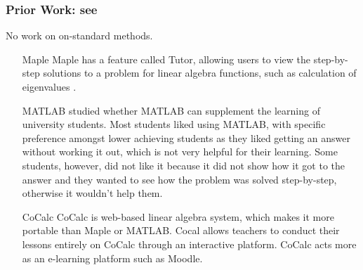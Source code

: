 \begin{frame}%
\frametitle{Prior Work: see \cite{PaiDavenport2021a}}%
No work on on-standard methods.\pause
\begin{itemize}[<+->]
\item[Maple] Maple has a feature called Tutor, allowing users to view the step-by-step solutions to a problem for linear algebra functions, such as calculation of eigenvalues \cite{eigentutor}.

\item[MATLAB] 
\cite{matlab} studied whether MATLAB can %
supplement the learning of university students. Most students liked using MATLAB, with specific preference amongst lower achieving students as they liked getting an answer without working it out, which is not very helpful for their learning. Some students, however, did not like it because it did not show how it got to the answer and they wanted to see how the problem was solved step-by-step, otherwise it wouldn't help them. %

\item[CoCalc] CoCalc \cite{Stein2018a} is web-based linear algebra system, which makes it more portable than Maple or MATLAB. 
Cocal allows teachers to conduct their lessons entirely on CoCalc through an interactive platform. %
CoCalc acts more as an e-learning platform such as Moodle.%
\end{itemize}
\end{frame}

